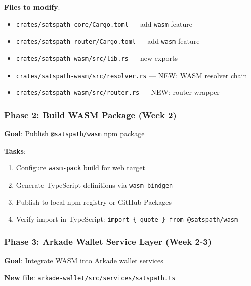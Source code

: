 \documentclass[
]{article}
\providecommand{\tightlist}{%
  \setlength{\itemsep}{0pt}\setlength{\parskip}{0pt}}
\begin{document}
\textbf{Files to modify}:

\begin{itemize}
\tightlist
\item
  \texttt{crates/satspath-core/Cargo.toml} --- add \texttt{wasm} feature
\item
  \texttt{crates/satspath-router/Cargo.toml} --- add \texttt{wasm}
  feature
\item
  \texttt{crates/satspath-wasm/src/lib.rs} --- new exports
\item
  \texttt{crates/satspath-wasm/src/resolver.rs} --- NEW: WASM resolver
  chain
\item
  \texttt{crates/satspath-wasm/src/router.rs} --- NEW: router wrapper
\end{itemize}

\hypertarget{phase-2-build-wasm-package-week-2}{%
\subsubsection{Phase 2: Build WASM Package (Week
2)}\label{phase-2-build-wasm-package-week-2}}

\textbf{Goal}: Publish \texttt{@satspath/wasm} npm package

\textbf{Tasks}:

\begin{enumerate}
\def\labelenumi{\arabic{enumi}.}
\tightlist
\item
  Configure \texttt{wasm-pack} build for web target
\item
  Generate TypeScript definitions via \texttt{wasm-bindgen}
\item
  Publish to local npm registry or GitHub Packages
\item
  Verify import in TypeScript:
  \texttt{import\ \{\ quote\ \}\ from\ \textquotesingle{}@satspath/wasm\textquotesingle{}}
\end{enumerate}

\hypertarget{phase-3-arkade-wallet-service-layer-week-2-3}{%
\subsubsection{Phase 3: Arkade Wallet Service Layer (Week
2-3)}\label{phase-3-arkade-wallet-service-layer-week-2-3}}

\textbf{Goal}: Integrate WASM into Arkade wallet services

\textbf{New file}: \texttt{arkade-wallet/src/services/satspath.ts}
\end{document}
